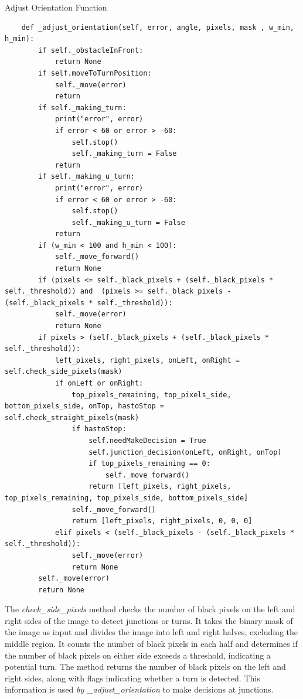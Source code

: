 \documentclass[../../main]{subfiles}
\begin{document}
\begin{codebox}[label=judeFig28]{Adjust Orientation Function}

\begin{verbatim}
    def _adjust_orientation(self, error, angle, pixels, mask , w_min, h_min):
        if self._obstacleInFront:
            return None
        if self.moveToTurnPosition:
            self._move(error)
            return
        if self._making_turn:
            print("error", error)
            if error < 60 or error > -60:
                self.stop()
                self._making_turn = False
            return
        if self._making_u_turn:
            print("error", error)
            if error < 60 or error > -60:
                self.stop()
                self._making_u_turn = False
            return
        if (w_min < 100 and h_min < 100):
            self._move_forward()
            return None
        if (pixels <= self._black_pixels + (self._black_pixels * self._threshold)) and  (pixels >= self._black_pixels - (self._black_pixels * self._threshold)):
            self._move(error)
            return None
        if pixels > (self._black_pixels + (self._black_pixels * self._threshold)):
            left_pixels, right_pixels, onLeft, onRight = self.check_side_pixels(mask)
            if onLeft or onRight:
                top_pixels_remaining, top_pixels_side, bottom_pixels_side, onTop, hastoStop = self.check_straight_pixels(mask)
                if hastoStop:
                    self.needMakeDecision = True
                    self.junction_decision(onLeft, onRight, onTop)
                    if top_pixels_remaining == 0:
                        self._move_forward()
                    return [left_pixels, right_pixels, top_pixels_remaining, top_pixels_side, bottom_pixels_side]
                self._move_forward()
                return [left_pixels, right_pixels, 0, 0, 0]
            elif pixels < (self._black_pixels - (self._black_pixels * self._threshold)):
                self._move(error)
                return None
        self._move(error)
        return None
\end{verbatim}
\end{codebox}


The \emph{check\_side\_pixels} method checks the number of black pixels
on the left and right sides of the image to detect junctions or turns.
It takes the binary mask of the image as input and divides the image
into left and right halves, excluding the middle region. It counts the
number of black pixels in each half and determines if the number of
black pixels on either side exceeds a threshold, indicating a potential
turn. The method returns the number of black pixels on the left and
right sides, along with flags indicating whether a turn is detected.
This information is used \emph{by \_adjust\_orientation} to make
decisions at junctions.
\end{document}
